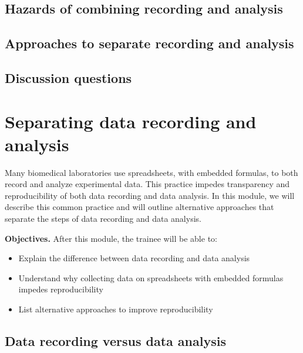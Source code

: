 \documentclass[]{tufte-book}
\providecommand{\tightlist}{%
  \setlength{\itemsep}{0pt}\setlength{\parskip}{0pt}}
\begin{document}
\hypertarget{hazards-of-combining-recording-and-analysis-13}{%
\subsection{Hazards of combining recording and analysis}\label{hazards-of-combining-recording-and-analysis-13}}

\hypertarget{approaches-to-separate-recording-and-analysis-13}{%
\subsection{Approaches to separate recording and analysis}\label{approaches-to-separate-recording-and-analysis-13}}

\hypertarget{discussion-questions-13}{%
\subsection{Discussion questions}\label{discussion-questions-13}}

\hypertarget{separating-data-recording-and-analysis-14}{%
\section{Separating data recording and analysis}\label{separating-data-recording-and-analysis-14}}

Many biomedical laboratories use spreadsheets, with embedded formulas, to both
record and analyze experimental data. This practice impedes transparency and
reproducibility of both data recording and data analysis. In this module, we
will describe this common practice and will outline alternative approaches that
separate the steps of data recording and data analysis.

\textbf{Objectives.} After this module, the trainee will be able to:

\begin{itemize}
\tightlist
\item
  Explain the difference between data recording and data analysis
\item
  Understand why collecting data on spreadsheets with embedded formulas impedes
  reproducibility
\item
  List alternative approaches to improve reproducibility
\end{itemize}

\hypertarget{data-recording-versus-data-analysis-14}{%
\subsection{Data recording versus data analysis}\label{data-recording-versus-data-analysis-14}}
\end{document}
